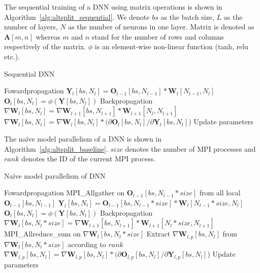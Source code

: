 The sequential training of a DNN using matrix operations is shown in 
Algorithm~\ref{alg:altsplit_sequential}. We denote $bs$ as the batch size, $L$ 
as the number of layers, $N$ as the number of neurons in one layer. Matrix is 
denoted as $\pmb{A}[m,n]$ whereas $m$ and $n$ stand for the number of rows and 
columns respectively of the matrix. $\phi$ is an element-wise non-linear 
function (tanh, relu etc.).
\begin{algorithm}[H]%
\caption{Sequential DNN}
\label{alg:altsplit_sequential}
{\fontsize{10}{10}\selectfont
\begin{algorithmic}[1]
    \Comment Fowardpropagation 
        \State $\pmb{Y}_l[bs, N_l] = \pmb{O}_{l-1}[bs, N_{l-1}] * \pmb{W}_{l}[N_{l-1}, N_l]$
        \State $\pmb{O}_l[bs, N_l] = \phi(\pmb{Y}[bs, N_l])$
    \EndFor
    \Comment Backpropagation 
    \State $\nabla \pmb{W}_l[bs, N_l]  = \nabla \pmb{W}_{l+1}[bs, N_{l+1}] * \pmb{W}_{l+1}[N_l, N_{l+1}]$
    \State $\nabla \pmb{W}_l[bs, N_l] = \nabla \pmb{W}_l[bs, N_l] * (\partial \pmb{O}_l[bs, N_l] / \partial \pmb{Y}_l[bs, N_l]$)
    \EndFor
    \State Update parameters
\end{algorithmic}}
\end{algorithm}

The na\"{i}ve model parallelism of a DNN is shown in 
Algorithm~\ref{alg:altsplit_baseline}. $size$ denotes the number of MPI 
processes and $rank$ denotes the ID of the current MPI process.
\begin{algorithm}[H]
\caption{Na\"{i}ve model parallelism of DNN}
\label{alg:altsplit_baseline}
{\fontsize{10}{10}\selectfont
\begin{algorithmic}[1]
    \Comment Fowardpropagation 
            \State MPI\_Allgather on $\pmb{O}_{l-1}[bs, N_{l-1}*size]$ from all local $\pmb{O}_{l-1}[bs, N_{l-1}]$
            \State $\pmb{Y}_l[bs, N_l] = \pmb{O}_{l-1}[bs, N_{l-1}*size] * \pmb{W}_{l}[N_{l-1}*size, N_l]$
            \State $\pmb{O}_l[bs, N_l] = \phi(\pmb{Y}[bs, N_l])$
        \EndFor
    \EndFor
    \Comment Backpropagation 
            \State $\nabla \pmb{W}_l[bs, N_l*size]  = \nabla \pmb{W}_{l+1}[bs, N_{l+1}] * \pmb{W}_{l+1}[N_l*size, N_{l+1}]$
            \State MPI\_Allreduce\_sum on  $\nabla \pmb{W}_l[bs, N_l*size]$
            \State Extract $\nabla \pmb{W}_{l,p}[bs, N_l]$ from $\nabla \pmb{W}_l[bs, N_l*size]$ according to $rank$
            \State $\nabla \pmb{W}_{l,p}[bs, N_l] = \nabla \pmb{W}_{l,p}[bs, N_l] * (\partial \pmb{O}_{l,p}[bs, N_l] / \partial \pmb{Y}_{l,p}[bs, N_l]$)
        \EndFor
    \EndFor
        \State Update parameters
    \EndFor
\end{algorithmic}}
\end{algorithm}

